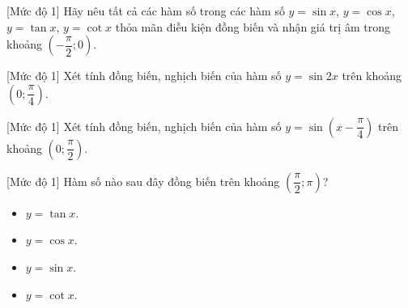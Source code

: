 \begin{bt}%
	[Mức độ 1]
	Hãy nêu tất cả các hàm số trong các hàm số $ y = \sin x$, $y = \cos x$, $y = \tan x$, $y = \cot x $ thỏa mãn điều kiện đồng biến và nhận giá trị âm trong khoảng $ \left ( - \dfrac{\pi}{2};0 \right ) $.
\end{bt}

\begin{bt}%
	[Mức độ 1]
	Xét tính đồng biến, nghịch biến của hàm số $y=\sin 2x$ trên khoảng $\left(0;\dfrac{\pi}{4}\right)$.
\end{bt}

\begin{bt}%
	[Mức độ 1]
	Xét tính đồng biến, nghịch biến của hàm số $y=\sin\left(x-\dfrac{\pi}{4}\right)$ trên khoảng $\left(0;\dfrac{\pi}{2}\right)$.
\end{bt}

\begin{bt}%
	[Mức độ 1]
	Hàm số nào sau đây đồng biến trên khoảng $\left(\dfrac{\pi}{2};\pi\right)$?
	\begin{itemize}
		\item $y=\tan x$.
		\item $y=\cos x$.
		\item $y=\sin x$.
		\item $y=\cot x$.
	\end{itemize}
\end{bt}

